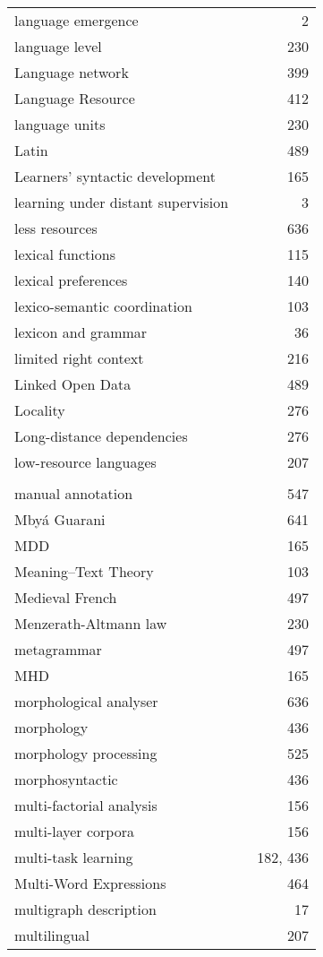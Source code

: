 \documentclass{easychair}
\begin{document}
\begin{longtable}{lp{7em}r}
\\
language emergence & & 2 
\\
language level & & 230 
\\
Language network & & 399 
\\
Language Resource & & 412 
\\
language units & & 230 
\\
Latin & & 489 
\\
Learners' syntactic development & & 165 
\\
learning under distant supervision & & 3 
\\
less resources & & 636 
\\
lexical functions & & 115 
\\
lexical preferences & & 140 
\\
lexico-semantic coordination & & 103 
\\
lexicon and grammar & & 36 
\\
limited right context & & 216 
\\
Linked Open Data & & 489 
\\
Locality & & 276 
\\
Long-distance dependencies & & 276 
\\
low-resource languages & & 207 
\\
\\
manual annotation & & 547 
\\
Mby\'a Guarani & & 641 
\\
MDD & & 165 
\\
Meaning--Text Theory & & 103 
\\
Medieval French & & 497 
\\
Menzerath-Altmann law & & 230 
\\
metagrammar & & 497 
\\
MHD & & 165 
\\
morphological analyser & & 636 
\\
morphology & & 436 
\\
morphology processing & & 525 
\\
morphosyntactic & & 436 
\\
multi-factorial analysis & & 156 
\\
multi-layer corpora & & 156 
\\
multi-task learning & & 182, 436 
\\
Multi-Word Expressions & & 464 
\\
multigraph description & & 17 
\\
multilingual & & 207 
\\

\end{longtable}
\end{document}
